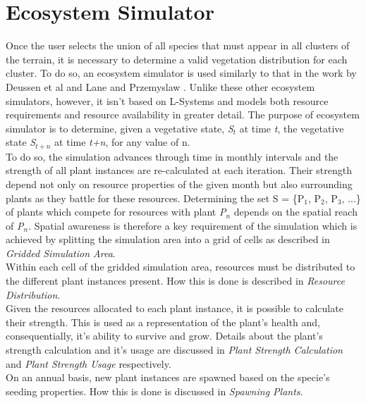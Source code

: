 \section{Ecosystem Simulator} \label{sec:ecosystem_simulator}

Once the user selects the union of all species that must appear in all clusters of the terrain, it is necessary to determine a valid vegetation distribution for each cluster. To do so, an ecosystem simulator is used similarly to that in the work by Deussen et al \cite{Deussen1998} and Lane and Przemyslaw \cite{Lane2002}. Unlike these other ecosystem simulators, however, it isn't based on L-Systems and models both resource requirements and resource availability in greater detail. The purpose of ecosystem simulator is to determine, given a vegetative state, \textit{S$_{t}$} at time \textit{t}, the vegetative state \textit{S$_{t+n}$} at time \textit{t+n}, for any value of n.  \\

To do so, the simulation advances through time in monthly intervals and the strength of all plant instances are re-calculated at each iteration. Their strength depend not only on resource properties of the given month but also surrounding plants as they battle for these resources. Determining the set S = \{P$_{1}$, P$_{2}$, P$_{3}$, ...\} of plants which compete for resources with plant \textit{P$_{n}$} depends on the spatial reach of \textit{P$_{n}$}. Spatial awareness is therefore a key requirement of the simulation which is achieved by splitting the simulation area into a grid of cells as described in \textit{Gridded Simulation Area}.\\

Within each cell of the gridded simulation area, resources must be distributed to the different plant instances present. How this is done is described in \textit{Resource Distribution}. \\

Given the resources allocated to each plant instance, it is possible to calculate their strength. This is used as a representation of the plant's health and, consequentially, it's ability to survive and grow. Details about the plant's strength calculation and it's usage are discussed in \textit{Plant Strength Calculation} and \textit{Plant Strength Usage} respectively.\\

On an annual basis, new plant instances are spawned based on the specie's seeding properties. How this is done is discussed in \textit{Spawning Plants}.\\

